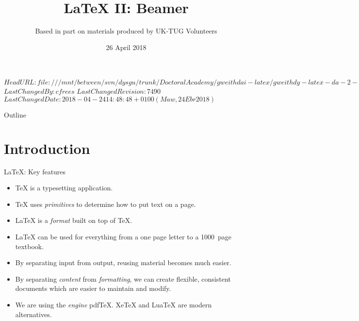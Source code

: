 \svnidlong
{$HeadURL: file:///mnt/between/svn/dysgu/trunk/DoctoralAcademy/gweithdai-latex/gweithdy-latex-da-2-beamer/training.tex $}
{$LastChangedBy: cfrees $}
{$LastChangedRevision: 7490 $}
{$LastChangedDate: 2018-04-24 14:48:48 +0100 (Maw, 24 Ebr 2018) $}



\title{\LaTeX{} II: Beamer}
\subtitle{Based in part on materials produced by UK-TUG Volunteers}
\date{ 26 April 2018}

{
}
{
  \newcolumntype{q}{l}
}




\begin{frame}
  \titlepage
\end{frame}

\maketitle


\tableofcontents

%
{
  \begin{frame}{Outline}
	\tableofcontents
  \end{frame}
}

%

\section{Introduction}

\begin{frame}{\LaTeX{}: Key features}

  \begin{itemize}
	\item \TeX{} is a typesetting application.
	\item \TeX{} uses \emph{primitives} to determine how to put text on a page.
	\item \LaTeX{} is  a \emph{format} built on top of \TeX{}.
	\item \LaTeX{} can be used for everything from a one page letter to a 1000~page textbook.
	\item By separating input from output, reusing material becomes much easier.
	\item By separating \emph{content} from \emph{formatting}, we can create flexible, consistent documents which are easier to maintain and modify.
	\item We are using the \emph{engine} pdf\TeX{}.
	Xe\TeX{} and Lua\TeX{} are modern alternatives.
  \end{itemize}

\end{frame}

